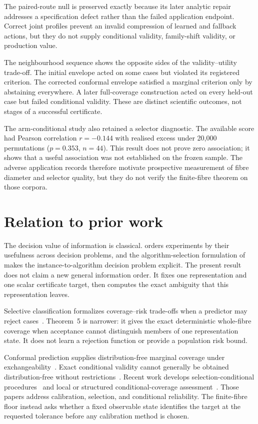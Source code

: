 \documentclass[10pt]{article}
\newcommand{\1}{\mathbf{1}}
\begin{document}
The paired-route null is preserved exactly because its later analytic repair addresses a specification defect rather than the failed application endpoint. Correct joint profiles prevent an invalid compression of learned and fallback actions, but they do not supply conditional validity, family-shift validity, or production value.

The neighbourhood sequence shows the opposite sides of the validity--utility trade-off. The initial envelope acted on some cases but violated its registered criterion. The corrected conformal envelope satisfied a marginal criterion only by abstaining everywhere. A later full-coverage construction acted on every held-out case but failed conditional validity. These are distinct scientific outcomes, not stages of a successful certificate.

The arm-conditional study also retained a selector diagnostic. The available score had Pearson correlation $r=-0.144$ with realised excess under 20,000 permutations ($p=0.353$, $n=44$). This result does not prove zero association; it shows that a useful association was not established on the frozen sample. The adverse application records therefore motivate prospective measurement of fibre diameter and selector quality, but they do not verify the finite-fibre theorem on those corpora.

\section{Relation to prior work}
The decision value of information is classical. \citet{blackwell1953} orders experiments by their usefulness across decision problems, and the algorithm-selection formulation of \citet{rice1976} makes the instance-to-algorithm decision problem explicit. The present result does not claim a new general information order. It fixes one representation and one scalar certificate target, then computes the exact ambiguity that this representation leaves.

Selective classification formalizes coverage--risk trade-offs when a predictor may reject cases~\citep{elyaniv2010,geifman2017}. Theorem~5 is narrower: it gives the exact deterministic whole-fibre coverage when acceptance cannot distinguish members of one representation state. It does not learn a rejection function or provide a population risk bound.

Conformal prediction supplies distribution-free marginal coverage under exchangeability~\citep{vovk2005,angelopoulos2023}. Exact conditional validity cannot generally be obtained distribution-free without restrictions~\citep{barber2021}. Recent work develops selection-conditional procedures~\citep{jin2025,sale2025} and local or structured conditional-coverage assessment~\citep{zhou2026,min2026}. Those papers address calibration, selection, and conditional reliability. The finite-fibre floor instead asks whether a fixed observable state identifies the target at the requested tolerance before any calibration method is chosen.
\end{document}
